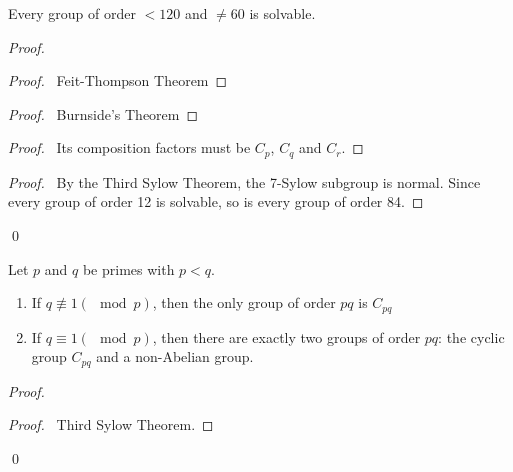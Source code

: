 \begin{prop}
Every group of order $< 120$ and $\neq 60$ is solvable.
\end{prop}

\begin{proof}
\pf
{}
\begin{proof}
	\pf\ Feit-Thompson Theorem
\end{proof}
\begin{proof}
	\pf\ Burnside's Theorem
\end{proof}
\begin{proof}
	\pf\ Its composition factors must be $C_p$, $C_q$ and $C_r$.
\end{proof}
\begin{proof}
	\pf\ By the Third Sylow Theorem, the 7-Sylow subgroup is normal. Since every group of order 12 is solvable, so is every group of order 84.
\end{proof}
\qed
\end{proof}

\begin{prop}
Let $p$ and $q$ be primes with $p < q$. 
\begin{enumerate}
\item If $q \not\equiv 1 (\mod p)$, then the only group of order $pq$ is $C_{pq}$
\item If $q \equiv 1 (\mod p)$, then there are exactly two groups of order $pq$: the cyclic group $C_{pq}$ and a non-Abelian group.
\end{enumerate}
\end{prop}

\begin{proof}
\pf
{}
\begin{proof}
	\pf\ Third Sylow Theorem.
\end{proof}
\qed
\end{proof}